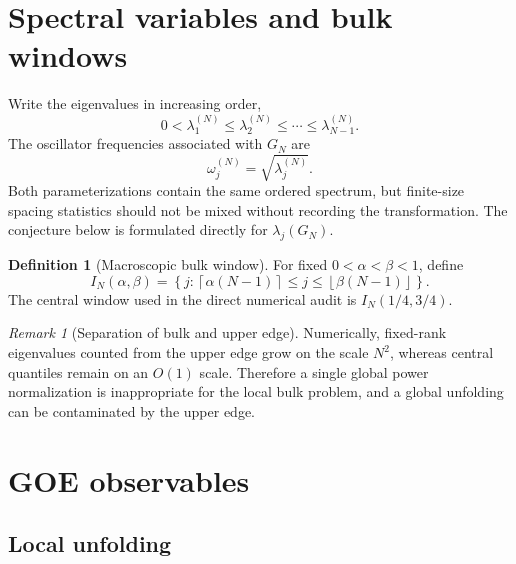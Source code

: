 \documentclass[11pt]{amsart}
\numberwithin{equation}{section}
\theoremstyle{plain}
\theoremstyle{definition}
\newtheorem{definition}[theorem]{Definition}
\theoremstyle{remark}
\newtheorem{remark}[theorem]{Remark}
\begin{document}
\section{Spectral variables and bulk windows}
\label{sec:spectral_variables}

Write the eigenvalues in increasing order,
\begin{equation}
0<\lambda_1^{(N)}\le\lambda_2^{(N)}\le\cdots\le\lambda_{N-1}^{(N)}.
\label{eq:eigenvalue_order}
\end{equation}
The oscillator frequencies associated with $G_N$ are
\begin{equation}
\omega_j^{(N)}=\sqrt{\lambda_j^{(N)}}.
\label{eq:oscillator_frequency}
\end{equation}
Both parameterizations contain the same ordered spectrum, but finite-size spacing statistics should not be mixed without recording the transformation.  The conjecture below is formulated directly for $\lambda_j(G_N)$.

\begin{definition}[Macroscopic bulk window]
\label{def:bulk_window}
For fixed $0<\alpha<\beta<1$, define
\begin{equation}
I_N(\alpha,\beta)
=
\left\{j:\left\lceil\alpha(N-1)\right\rceil
\le j\le
\left\lfloor\beta(N-1)\right\rfloor\right\}.
\label{eq:bulk_window}
\end{equation}
The central window used in the direct numerical audit is $I_N(1/4,3/4)$.
\end{definition}

\begin{remark}[Separation of bulk and upper edge]
\label{rem:edge_bulk_separation}
Numerically, fixed-rank eigenvalues counted from the upper edge grow on the scale $N^2$, whereas central quantiles remain on an $O(1)$ scale.  Therefore a single global power normalization is inappropriate for the local bulk problem, and a global unfolding can be contaminated by the upper edge.
\end{remark}

\section{GOE observables}
\label{sec:goe_observables}

\subsection{Local unfolding}
\label{subsec:unfolding}
\end{document}
